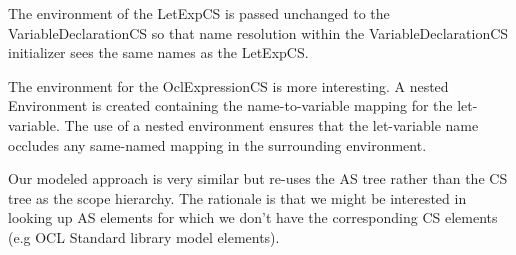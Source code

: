 \documentclass{llncs}
\begin{document}
The environment of the LetExpCS is passed unchanged to the VariableDeclarationCS so that name resolution within the VariableDeclarationCS initializer sees the same names as the LetExpCS.

The environment for the OclExpressionCS is more interesting. A nested Environment is created containing the name-to-variable mapping for the let-variable. The use of a nested environment ensures that the let-variable name occludes any same-named mapping in the surrounding environment.



Our modeled approach is very similar but re-uses the AS tree rather than the CS tree as the scope hierarchy. 
The rationale is that we might be interested in looking up AS elements for which we don't have the corresponding CS elements (e.g OCL Standard library model elements).


\end{document}
